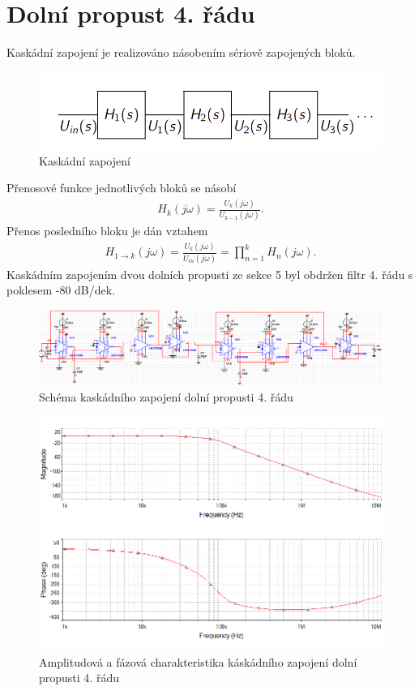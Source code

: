 \documentclass[twoside]{article}
\begin{document}
\section{Dolní propust 4. řádu}
Kaskádní zapojení je realizováno násobením sériově zapojených bloků.
\begin{figure}[H]
\centering
\includegraphics[scale=0.4]{schemata.png}
\caption{Kaskádní zapojení \cite{4}}
\end{figure}
Přenosové funkce jednotlivých bloků se násobí
\begin{align}
H_k(j\omega) = \frac{U_k (j\omega)}{U_{k-1}(j\omega)}.
\end{align}
Přenos posledního bloku je dán vztahem
\begin{align}
H_{1 \rightarrow k}(j\omega) = \frac{U_k (j\omega)}{U_{in}(j\omega)} = \prod _{n=1}^{k} H_n(j\omega).
\end{align}
Kaskádním zapojením dvou dolních propusti ze sekce 5 byl obdržen filtr 4. řádu s poklesem -80 dB/dek. 
\begin{figure}[H]
\centering
\includegraphics[scale=0.6]{lrcx2.png}
\caption{Schéma kaskádního zapojení dolní propusti 4. řádu}
\end{figure}
\begin{figure}[H]
\centering
\includegraphics[scale=0.6]{lrcx2ampl.png}
\caption{Amplitudová a fázová charakteristika káskádního zapojení dolní propusti 4. řádu}
\end{figure}
\end{document}

